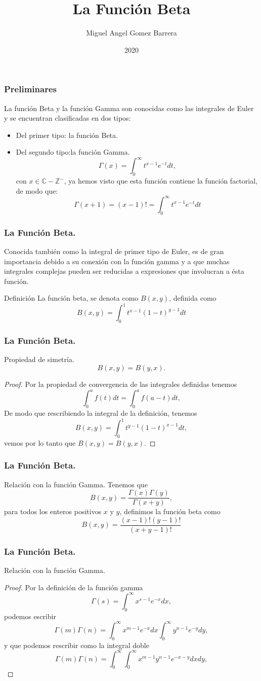 \documentclass{beamer}
\title{La Función Beta}
\author{Miguel Angel Gomez Barrera}
\institute{Fundación Universitaria Konrad Lorenz}
\date{2020}
\begin{document}
	\frame{\titlepage}
	\begin{frame}
	\frametitle{Preliminares}
		La función Beta y la función Gamma son conocidas como las integrales de Euler y se encuentran clasificadas en dos tipos:
		\begin{itemize}
			\item Del primer tipo: la función Beta.
			\item Del segundo tipo:la función Gamma.
			$$\Gamma(x) = \int_{0}^{\infty} t^{x-1} e^{-t} dt,$$
			con $x \in \mathbb{C}-\mathbb{Z}^-$, ya hemos visto que esta función contiene la función factorial, de modo que:
			$$\Gamma(x+1) = (x-1)! = \int_{0}^{\infty} t^{x-1} e^{-t} dt$$
		\end{itemize}		
	\end{frame}
	\begin{frame}
		\frametitle{La Función Beta.}
		Conocida también como la integral de primer tipo de Euler, es de gran importancia debido a su conexión con la función gamma y a que muchas integrales complejas pueden ser reducidas a expresiones que involucran a ésta función.
		\begin{block}{Definición}
			La función beta, se denota como $B(x,y)$, definida como
			$$B(x,y) = \int_{0}^{1} t^{x-1}(1-t)^{y-1}dt$$
		\end{block} 
	\end{frame}
	\begin{frame}
		\frametitle{La Función Beta.}
		\begin{block}{Propiedad de simetría.}
			$$B(x,y) = B(y,x).$$
			\begin{proof}
				Por la propiedad de convergencia de las integrales definidas tenemos
				$$\int_{0}^{a} f(t) dt = \int_{0}^{a} f(a-t) dt,$$
				De modo que rescribiendo la integral de la definición, tenemos
				$$B(x,y) = \int_{0}^{1} t^{y-1}(1-t)^{x-1} dt,$$
				vemos por lo tanto que $B(x,y) = B(y,x)$. 
			\end{proof}
		\end{block}
	\end{frame}
	\begin{frame}
	\frametitle{La Función Beta.}
		\begin{block}{Relación con la función Gamma.}
			Tenemos que
			$$B(x,y) = \frac{\Gamma(x)\Gamma(y)}{\Gamma(x+y)},$$
			para todos los enteros positivos $x$ y $y$, definimos la función beta como
			$$B(x,y) = \frac{(x-1)!(y-1)!}{(x+y-1)!}$$
		\end{block}
	\end{frame}
	\begin{frame}
	\frametitle{La Función Beta.}
	\begin{block}{Relación con la función Gamma.}
		\begin{proof}
			Por la definición de la función gamma
			$$\Gamma(s) = \int_{0}^{\infty} x^{s-1}e^{-x} dx,$$
			podemos escribir
			$$\Gamma(m)\Gamma(n) = \int_{0}^{\infty} x^{m-1}e^{-x} dx \int_{0}^{\infty} y^{n-1}e^{-y} dy,$$
			y que podemos rescribir como la integral doble
			$$\Gamma(m)\Gamma(n) = \int_{0}^{\infty}\int_{0}^{\infty} x^{m-1} y^{n-1}e^{-x-y} dx dy,$$ 
		\end{proof}
	\end{block}
	\end{frame}
\end{document}
